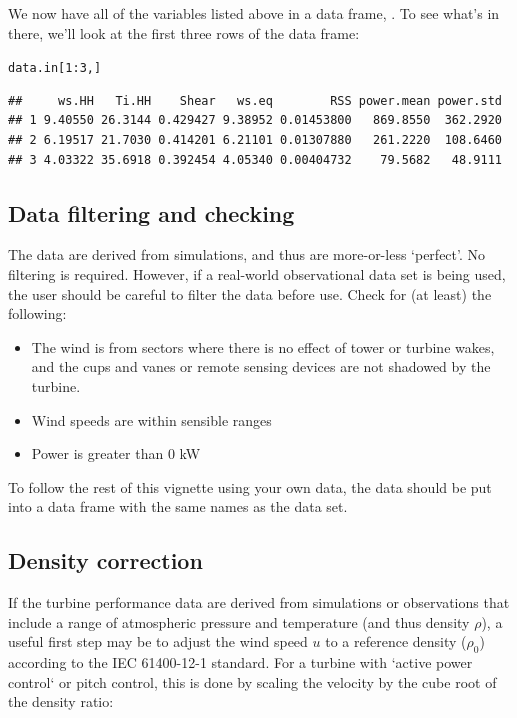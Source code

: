 \documentclass[nojss]{jss}\usepackage[]{graphicx}\usepackage[]{color}
\makeatletter
\newcommand{\hlnum}[1]{\textcolor[rgb]{0.686,0.059,0.569}{#1}}%
\newcommand{\hlopt}[1]{\textcolor[rgb]{0,0,0}{#1}}%
\newcommand{\hlstd}[1]{\textcolor[rgb]{0.345,0.345,0.345}{#1}}%
\newenvironment{kframe}{%
 \def\at@end@of@kframe{}%
 \ifinner\ifhmode%
  \def\at@end@of@kframe{\end{minipage}}%
  \begin{minipage}{\columnwidth}%
 \fi\fi%
 \def\FrameCommand##1{\hskip\@totalleftmargin \hskip-\fboxsep
 \colorbox{shadecolor}{##1}\hskip-\fboxsep
     \hskip-\linewidth \hskip-\@totalleftmargin \hskip\columnwidth}%
 \MakeFramed {\advance\hsize-\width
   \@totalleftmargin\z@ \linewidth\hsize
   \@setminipage}}%
 {\par\unskip\endMakeFramed%
 \at@end@of@kframe}
\newenvironment{knitrout}{}{} %
\makeatother
\begin{document}
We now have all of the variables listed above in a data frame, . To see what's in there, we'll look at the first three rows of the data frame:

\begin{knitrout}
\color{fgcolor}\begin{kframe}
\begin{alltt}
\hlstd{data.in[}\hlnum{1}\hlopt{:}\hlnum{3}\hlstd{,]}
\end{alltt}
\begin{verbatim}
##     ws.HH   Ti.HH    Shear   ws.eq        RSS power.mean power.std
## 1 9.40550 26.3144 0.429427 9.38952 0.01453800   869.8550  362.2920
## 2 6.19517 21.7030 0.414201 6.21101 0.01307880   261.2220  108.6460
## 3 4.03322 35.6918 0.392454 4.05340 0.00404732    79.5682   48.9111
\end{verbatim}
\end{kframe}
\end{knitrout}

\subsection{Data filtering and checking}
The  data are derived from simulations, and thus are more-or-less `perfect'. No filtering is required. However, if a real-world observational data set is being used, the user should be careful to filter the data before use. Check for (at least) the following:

\begin{itemize}
\item The wind is from sectors where there is no effect of tower or turbine wakes, and the cups and vanes or remote sensing devices are not shadowed by the turbine.
\item Wind speeds are within sensible ranges
\item Power is greater than 0 kW
\end{itemize}

To follow the rest of this vignette using your own data, the data should be put into a data frame with the same names as the  data set.

\subsection{Density correction}
If the turbine performance data are derived from simulations or observations that include a range of atmospheric pressure and temperature (and thus density $\rho$), a useful first step may be to adjust the wind speed $u$ to a reference density ($\rho_0$) according to the IEC 61400-12-1 standard. For a turbine with `active power control` or pitch control, this is done by scaling the velocity by the cube root of the density ratio:
\end{document}
